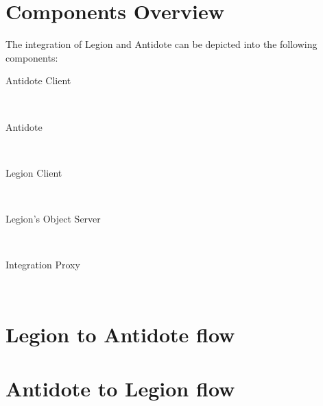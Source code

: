 \section{Components Overview}
\label{sec:components_overview}
The integration of Legion and Antidote can be depicted into the following components:
\begin{description}
\item[Antidote Client] \hfill \\


\item[Antidote] \hfill \\


\item[Legion Client] \hfill \\

\item[Legion's Object Server] \hfill \\

\item[Integration Proxy] \hfill \\


\end{description}

\section{Legion to Antidote flow}
\label{sec:legion_to_antidote_flow}

\section{Antidote to Legion flow}
\label{sec:antidote to legion flow}